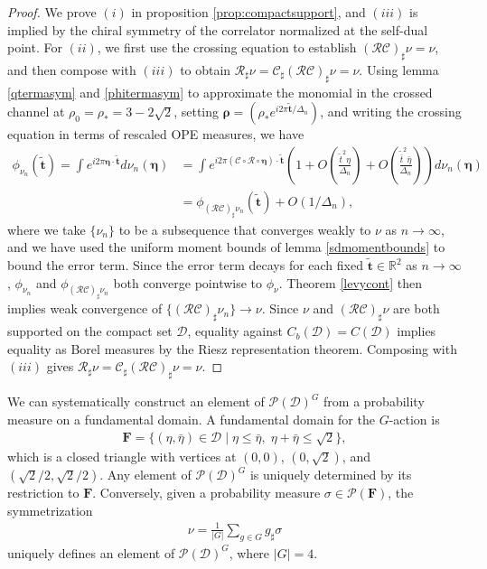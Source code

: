 \documentclass[a4paper,11pt]{article}
\theoremstyle{plain}
\theoremstyle{definition}
\theoremstyle{remark}
\newcommand{\bs}[1]{\boldsymbol{#1}}
\newcommand{\ba}{\begin{equation} \begin{aligned}}
\newcommand{\ea}{\end{aligned} \end{equation}}
\newcommand{\De}{\Delta}
\begin{document}
\begin{proof}
We prove $(i)$ in proposition \ref{prop:compactsupport}, and $(iii)$ is implied by the chiral symmetry of the correlator normalized at the self-dual point. For $(ii)$, we first use the crossing equation to establish $(\mathcal{RC})_\sharp \nu = \nu$, and then compose with $(iii)$ to obtain $\mathcal{R}_\sharp \nu = \mathcal{C}_\sharp (\mathcal{RC})_\sharp \nu = \nu$. Using lemma \ref{qtermasym} and \ref{phitermasym} to approximate the monomial in the crossed channel at $\rho_0 = \rho_* = 3-2\sqrt{2}$, setting $\bs{\rho} = (\rho_* e^{i 2\pi  \tilde{\bs{t}}/\De_n } ) $, and writing the crossing equation in terms of rescaled OPE measures, we have
\ba
\phi_{\nu_n}(\tilde{\bs{t}}) = \int e^{i2\pi \bs{\eta}\cdot \tilde{\bs{t}}} d\nu_n(\bs{\eta}) &= \int e^{i2\pi (\mathcal{C}\circ \mathcal{R} \circ \bs{\eta})\cdot \tilde{\bs{t}}}\left(1 + O\left(\frac{\tilde{t}^2 \eta}{\De_n} \right) +O\left(\frac{\tilde{\bar{t}}^2 \bar{\eta}}{\De_n} \right)  \right)d\nu_n(\bs{\eta}) \\
&= \phi_{(\mathcal{RC})_{\sharp} \nu_n }(\tilde{\bs{t}})  +O(1/\De_n),
\ea
where we take $\{\nu_n\}$ to be a subsequence that converges weakly to $\nu$ as $n\to\infty$, and we have used the uniform moment bounds of lemma \ref{sdmomentbounds} to bound the error term. Since the error term decays for each fixed $\tilde{\bs{t}} \in \mathbb{R}^2$ as $n \to \infty$, $\phi_{\nu_n}$ and $\phi_{(\mathcal{RC})_{\sharp}\nu_n}$ both converge pointwise to $\phi_{\nu}$. Theorem \ref{levycont} then implies weak convergence of $\{ (\mathcal{RC})_{\sharp}\nu_{n} \} \to \nu $. Since $\nu$ and $(\mathcal{RC})_\sharp\nu$ are both supported on the compact set $\mathcal{D}$, equality against $C_b(\mathcal{D}) = C(\mathcal{D})$ implies equality as Borel measures by the Riesz representation theorem. Composing with $(iii)$ gives $\mathcal{R}_\sharp\nu = \mathcal{C}_\sharp(\mathcal{RC})_\sharp\nu = \nu$.
\end{proof}
We can systematically construct an element of $\mathcal{P}(\mathcal{D})^G$ from a probability measure on a fundamental domain. A fundamental domain for the $G$-action is
\ba
\mathbf{F} = \{ (\eta,\bar{\eta}) \in \mathcal{D} \mid \eta \leq \bar{\eta}, \; \eta + \bar{\eta} \leq \sqrt{2}\},
\ea
which is a closed triangle with vertices at $(0,0)$, $(0,\sqrt{2})$, and $(\sqrt{2}/2,\sqrt{2}/2)$. Any element of $\mathcal{P}(\mathcal{D})^G$ is uniquely determined by its restriction to $\mathbf{F} $. Conversely, given a probability measure $\sigma\in \mathcal{P}(\mathbf{F})$, the symmetrization
\ba
\nu =\frac{1}{|G|} \sum_{g \in G} g_\sharp \sigma
\ea
uniquely defines an element of $\mathcal{P}(\mathcal{D})^G$, where $|G| = 4$.
\end{document}
